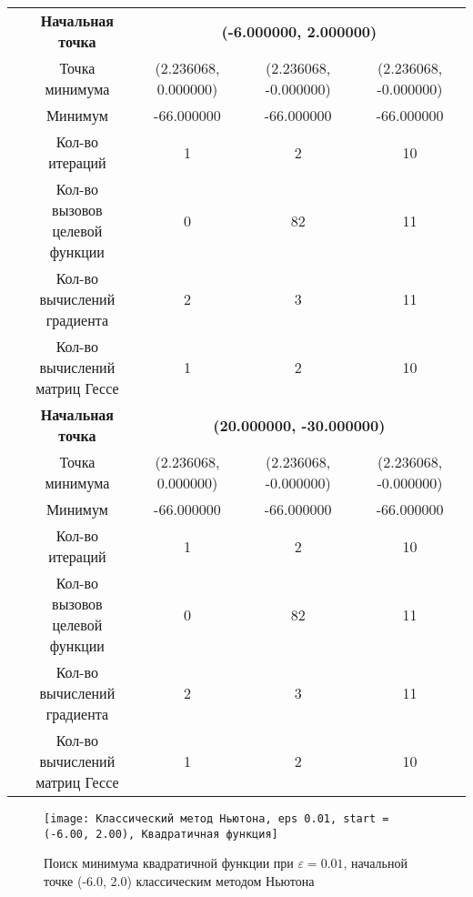 \begin{table}[H]
\begin{tabular}{|c|c|c|c|c|}
	\cline{2-5}
	\hline
	\multirow{12}{*}{\rotatebox[origin=c]{90}{$\varepsilon = 1e-06$}}&\textbf{Начальная точка} &\multicolumn{3}{c|}{\textbf{(-6.000000, 2.000000)}}\\
	\cline{2-5}
	&Точка минимума &(2.236068, 0.000000) &(2.236068, -0.000000) &(2.236068, -0.000000) \\ 
	\cline{2-5}
	&Минимум &-66.000000 &-66.000000 &-66.000000 \\ 
	\cline{2-5}
	&Кол-во итераций &1 &2 &10 \\ 
	\cline{2-5}
	&\makecell{Кол-во вызовов\\целевой функции} &0 &82 &11 \\ 
	\cline{2-5}
	&\makecell{Кол-во вычислений\\градиента} &2 &3 &11 \\ 
	\cline{2-5}
	&\makecell{Кол-во вычислений\\матриц Гессе} &1 &2 &10 \\ 
	\cline{2-5}
\cline{2-5}&\textbf{Начальная точка} &\multicolumn{3}{c|}{\textbf{(20.000000, -30.000000)}}\\
	\cline{2-5}
	&Точка минимума &(2.236068, 0.000000) &(2.236068, -0.000000) &(2.236068, -0.000000) \\ 
	\cline{2-5}
	&Минимум &-66.000000 &-66.000000 &-66.000000 \\ 
	\cline{2-5}
	&Кол-во итераций &1 &2 &10 \\ 
	\cline{2-5}
	&\makecell{Кол-во вызовов\\целевой функции} &0 &82 &11 \\ 
	\cline{2-5}
	&\makecell{Кол-во вычислений\\градиента} &2 &3 &11 \\ 
	\cline{2-5}
	&\makecell{Кол-во вычислений\\матриц Гессе} &1 &2 &10 \\ 
	\cline{2-5}
	\hline

\end{tabular}
\end{table}


            \begin{figure}[H]
	        \centering
	        \texttt{[image: Классический метод Ньютона, eps 0.01, start = (-6.00, 2.00), Квадратичная функция]}%
	        \caption{Поиск минимума квадратичной функции при $\varepsilon = 0.01$, начальной точке (-6.0, 2.0) классическим методом Ньютона}
	        \vspace*{-1.2cm}
            \end{figure}
            
